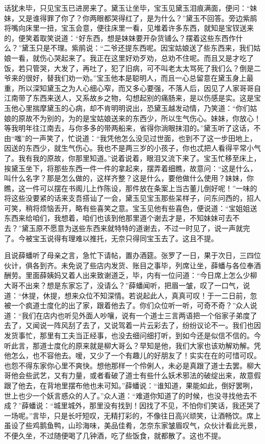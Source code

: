 话犹未毕，只见宝玉已进房来了。黛玉让坐毕，宝玉见黛玉泪痕满面，便问：``妹妹，又是谁得罪了你了？你两眼都哭得红了，是为什么？''黛玉不回答。旁边紫鹃将嘴向床里一扭，宝玉会意，便往床里一看，见堆着许多东西，就知是宝钗送来的，便笑着取笑说道：``好东西，想是妹妹要开杂货铺么？摆着这些东西作什么？''黛玉只是不理。紫鹃说：``二爷还提东西呢。因宝姑娘送了些东西来，我们姑娘一看，就伤心哭起来了。我正在这里好劝歹劝，总劝不住呢。而且又是才吃了饭，若只管哭，大发了，再吐了，犯了旧病，可不叫老太太骂死了我们么？倒是二爷来的很好，替我们劝一劝。''宝玉他本是聪明人，而且一心总留意在黛玉身上最重，所以深知黛玉之为人心细心窄，而又多心要强，不落人后，因见了人家哥哥自江南带了东西来送人，又系故乡之物，勾想起别的痛肠来，是以伤感是实。这是宝玉他心里揣摩黛玉的心病，却不肯明明说出，恐黛玉越发动情，乃笑道：``你们姑娘的原故不为别的，为的是宝姑娘送来的东西少，所以生气伤心。妹妹，你放心！等我明年往江南去，与你多多的带两船来，省得你淌眼抹泪的。''黛玉听了这话，不由``嗤''的一声笑了，忙说道：``我凭他怎么没见过世面，也到不了这一步田地上，因送的东西少，就生气伤心。我也不是两三岁的小孩子，你也忒把人看得平常小气了。我有我的原故，你那里知道。''说着说着，眼泪又流下来了。宝玉忙移至床上，挨黛玉坐下，将那些东西一件一件的拿起来，摆弄着细瞧，故意问：``这是什么，叫什么名字？那是怎么做的，这样齐整？这是什么，要他做什么使用？妹妹，你瞧，这一件可以摆在书阁儿上作陈设，那件放在条案上当古董儿倒好呢！''一味的将这些没要紧的话来支吾搭讪了一会，黛玉见宝玉那些呆样子，问东问西的，招人可笑，稍将烦恼丢开，略有些喜笑之意。宝玉见他有些喜色，便说道：``宝姐姐送东西来给咱们，我想着，咱们也该到他那里道个谢去才是，不知妹妹可去不去？''黛玉原不愿意为送些东西来就特特的道谢去，不过一时见了，说一声就完了。今被宝玉说得有理难以推托，无奈只得同宝玉去了。这且不提。

且说薛蟠听了母亲之言，急忙下请帖，置办酒筵。张罗了一日，果于次日，三四位伙计，俱各到齐。未免说了些店内发货、账目之事毕，列席让坐，薛蟠与各位奉酒酬劳。里面薛姨妈又着人出来致谢道乏，毕，内有一位问道：``今日席上怎么少柳大哥不出来？想是东家忘了，没请么？''薛蟠闻听，把眉一皱，叹了一口气，说道：``休提，休提，想来众位不知深情。若说起此人，真真可叹！于一二日前，忽被一个疯道士度化的出了家，跟着他去了。你们众位听一听，可奇不奇？''众人说道：``我们在店内也听见外面人吵嚷，说有一个道士三言两语把一个俗家子弟度了去了，又闻说一阵风刮了去了，又说驾着一片云彩去了，纷纷议论不一。我们也因发货事忙，那里有工夫当正经事，也没去细问细打听，到如今还是似信不信的。今听此言，那道士度化的原来就是柳大哥么？早知是他，我们大家也该劝解劝解。凭他怎么，也不容他去。嗳，又少了一个有趣儿的好朋友了！实实在在的可惜可叹。也怨不得东家你心里不爽快。想他那样一个伶俐人，未必是真跟了道士去罢。柳大哥他会些武艺，又有力量，或者看破了道士有些什么妖术邪法的破绽出来，故意假跟了他去，在背地里摆布他也未可知。''薛蟠说：``谁知道，果能如此，倒好罢咧，世上也少一个妖言惑众的人了。''众人道：``难道你知道了的时候，也没寻找他去不成？''薛蟠说：``城里城外，那里没有找到！因找了不见，不怕你们笑话，我还哭了一场呢。''言毕，只是长吁短叹，无精打彩的，不像往日高兴顽笑，让酒畅饮。席上虽设了些鸡鹅鱼鸭，山珍海味，美品佳肴，怎奈东家皱眉叹气，众伙计看此光景，不便久坐，不过随便喝了几钟酒，吃了些饭食，就都散了。这也不提。

